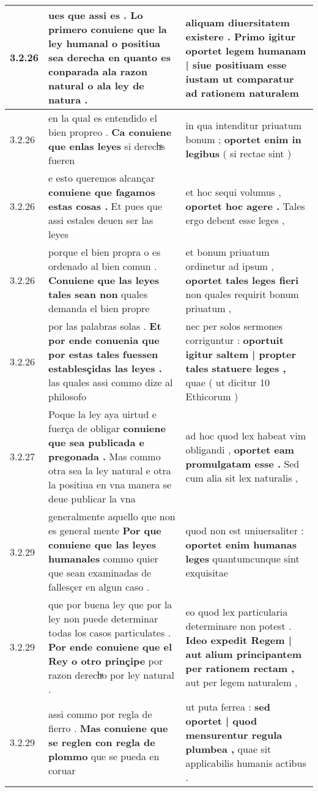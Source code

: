 \begin{tabular}{|p{1cm}|p{6.5cm}|p{6.5cm}|}
3.2.26 & ues que assi es . \textbf{ Lo primero conuiene que la ley humanal o positiua sea derecha } en quanto es conparada ala razon natural o ala ley de natura . & aliquam diuersitatem existere . \textbf{ Primo igitur oportet legem humanam | siue positiuam esse iustam } ut comparatur ad rationem naturalem \\\hline
3.2.26 & en la qual es entendido el bien propreo . \textbf{ Ca conuiene que enlas leyes } si derechͣs fueren & in qua intenditur priuatum bonum ; \textbf{ oportet enim in legibus } ( si rectae sint ) \\\hline
3.2.26 & e esto queremos alcançar \textbf{ conuiene que fagamos estas cosas . } Et pues que assi estales deuen ser las leyes & et hoc sequi volumus , \textbf{ oportet hoc agere . } Tales ergo debent esse leges , \\\hline
3.2.26 & porque el bien propra o es ordenado al bien comun . \textbf{ Conuiene que las leyes tales sean non } quales demanda el bien propre & et bonum priuatum ordinetur ad ipsum , \textbf{ oportet tales leges fieri } non quales requirit bonum priuatum , \\\hline
3.2.26 & por las palabras solas . \textbf{ Et por ende conuenia que por estas tales fuessen establesçidas las leyes . } las quales assi commo dize al philosofo & nec per solos sermones corriguntur : \textbf{ oportuit igitur saltem | propter tales statuere leges , } quae ( ut dicitur 10 Ethicorum ) \\\hline
3.2.27 & Poque la ley aya uirtud e fuerça de obligar \textbf{ conuiene que sea publicada e pregonada . } Mas commo otra sea la ley natural e otra la positiua en vna manera se deue publicar la vna & ad hoc quod lex habeat vim obligandi , \textbf{ oportet eam promulgatam esse . } Sed cum alia sit lex naturalis , \\\hline
3.2.29 & generalmente aquello que non es general mente \textbf{ Por que conuiene que las leyes humanales } commo quier que sean examinadas de fallesçer en algun caso . & quod non est uniuersaliter : \textbf{ oportet enim humanas leges } quantumcunque sint exquisitae \\\hline
3.2.29 & que por buena ley que por la ley non puede determinar todas los casos particulates . \textbf{ Por ende conuiene que el Rey o otro prinçipe } por razon derechͣo por ley natural . & eo quod lex particularia determinare non potest . \textbf{ Ideo expedit Regem | aut alium principantem per rationem rectam , } aut per legem naturalem , \\\hline
3.2.29 & assi commo por regla de fierro . \textbf{ Mas conuiene que se reglen con regla de plommo } que se pueda en coruar & ut puta ferrea : \textbf{ sed oportet | quod mensurentur regula plumbea , } quae sit applicabilis humanis actibus . \\\hline

\end{tabular}
